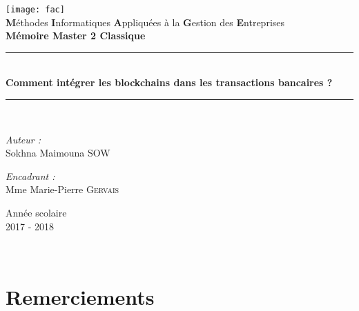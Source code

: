 \documentclass[12pt]{report}
\author{SOW Sokhna Maimouna} %
\begin{document}

\begin{titlepage}
\begin{center}

\texttt{[image: fac]}\\[1cm]

{\large\textbf{ M}éthodes \textbf{I}nformatiques \textbf{A}ppliquées à la \textbf{G}estion des \textbf{E}ntreprises}\\[0.8cm]


{\large \textbf{Mémoire Master 2 Classique}}\\[0.5cm]

\vfill

\rule{\linewidth}{0.5mm} \\[0.4cm]
{ \huge \bfseries Comment intégrer les blockchains dans les transactions bancaires ?  \\[0.4cm] }
\rule{\linewidth}{0.5mm} \\[1.5cm]

\vfill

\noindent
\begin{minipage}{0.5\textwidth}
  \begin{flushleft} \large
    \emph{Auteur :}\\
   Sokhna Maimouna \textsc{SOW}\\
  \end{flushleft}
\end{minipage}%
\begin{minipage}{0.5\textwidth}
  \begin{flushright} \large
    \emph{Encadrant :} \\
   Mme Marie-Pierre \textsc{Gervais}\\
  \end{flushright}
\end{minipage}

\vfill

{\large Année scolaire \\ 2017 - 2018}

\end{center}
\end{titlepage}

\thispagestyle{empty}
\newpage
~

\newpage
\section{Remerciements}
\end{document}
